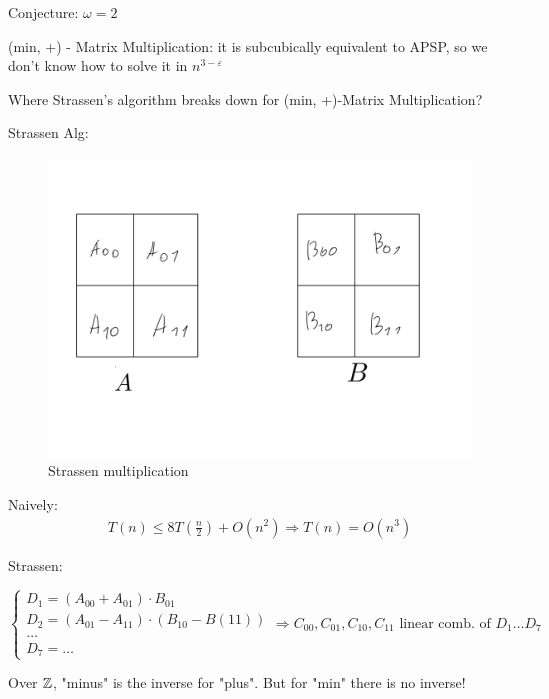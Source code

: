 Conjecture: $\omega = 2$

(min, +) - Matrix Multiplication: it is subcubically equivalent to APSP, so we don't know how to solve it in $n^{3 - \varepsilon}$

Where Strassen's algorithm breaks down for (min, +)-Matrix Multiplication?

Strassen Alg:

\begin{figure}[ht]
	\centering
	\includegraphics[scale=0.4]{figures/4.pdf}
	\caption{Strassen multiplication}
\end{figure}

Naively:
\begin{align*}
	T(n) \leq 8 T(\frac{n}{2}) + O(n^2) \Rightarrow T(n) = O(n^3)
\end{align*}

Strassen:

\begin{equation}
	\begin{cases}
		D_1 = (A_{00} + A_{01}) \cdot B_{01} \\
		D_2 = (A_{01} - A_{11}) \cdot (B_{10} - B({11})) \\
		\dots \\
		D_7 = \ldots
	\end{cases} \Rightarrow \text{$C_{00}, C_{01}, C_{10}, C_{11}$ linear comb. of $D_1 \dots D_7$  }
\end{equation}

Over $\mathbb{Z}$, "minus" is the inverse for "plus".
But for "min" there is no inverse!

